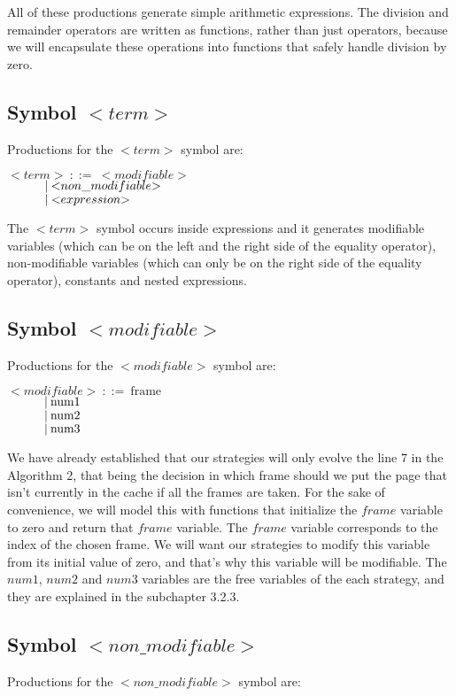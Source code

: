 All of these productions generate simple arithmetic expressions. The division and remainder operators are written as functions, rather than just operators, because we will encapsulate these operations into functions that safely handle division by zero.

\subsection{Symbol ${<}term{>}$}
Productions for the ${<}term{>}$ symbol are:

\noindent
$ {<}term{>}\:::=\:{<}modifiable{>} $\\
$ \indent\indent |\:{<}non\_modifiable{>} $\\
$ \indent\indent |\:{<}expression{>} $

The ${<}term{>}$ symbol occurs inside expressions and it generates modifiable variables (which can be on the left and the right side of the equality operator), non-modifiable variables (which can only be on the right side of the equality operator), constants and nested expressions.

\subsection{Symbol ${<}modifiable{>}$}
Productions for the ${<}modifiable{>}$ symbol are:

\noindent
$ {<}modifiable{>}\:::=\:\text{frame} $\\
$ \indent\indent |\:\text{num1} $\\
$ \indent\indent |\:\text{num2} $\\
$ \indent\indent |\:\text{num3} $

We have already established that our strategies will only evolve the line 7 in the Algorithm 2, that being the decision in which frame should we put the page that isn't currently in the cache if all the frames are taken. For the sake of convenience, we will model this with functions that initialize the $frame$ variable to zero and return that $frame$ variable. The $frame$ variable corresponds to the index of the chosen frame. We will want our strategies to modify this variable from its initial value of zero, and that's why this variable will be modifiable. The $num1$, $num2$ and $num3$ variables are the free variables of the each strategy, and they are explained in the subchapter 3.2.3.

\subsection{Symbol ${<}non\_modifiable{>}$}
Productions for the ${<}non\_modifiable{>}$ symbol are:

